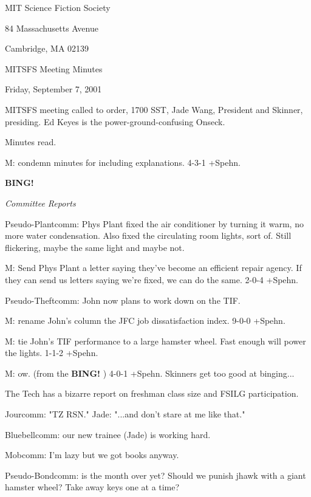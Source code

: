 \documentclass[12pt]{article}
\newcommand{\bing}{{\bf BING!} }
\newcommand{\goto}[1]{\bing \vskip 12pt \centerline{{\em{#1}}}}
\begin{document}
\begin{center}

MIT Science Fiction Society 

84 Massachusetts Avenue

Cambridge, MA 02139

\vspace{12pt}

MITSFS Meeting Minutes 

Friday, September 7, 2001

\end{center}
 
\vspace{18pt}

\setlength{\parskip}{6pt}

\noindent
MITSFS meeting called to order, 1700 SST, Jade Wang, President and
Skinner, presiding.  Ed Keyes is the power-ground-confusing Onseck.

Minutes read.

M: condemn minutes for including explanations. 4-3-1 +Spehn.

\goto{Committee Reports}

Pseudo-Plantcomm: Phys Plant fixed the air conditioner by turning it warm, no more water condensation. Also fixed the circulating room lights, sort of. Still flickering, maybe the same light and maybe not.

M: Send Phys Plant a letter saying they've become an efficient repair agency. If they can send us letters saying we're fixed, we can do the same. 2-0-4 +Spehn.

Pseudo-Theftcomm: John now plans to work down on the TIF.

M: rename John's column the JFC job dissatisfaction index. 9-0-0 +Spehn.

M: tie John's TIF performance to a large hamster wheel. Fast enough will power the lights. 1-1-2 +Spehn.

M: ow. (from the \bing) 4-0-1 +Spehn. Skinners get too good at binging...

The Tech has a bizarre report on freshman class size and FSILG participation.

Jourcomm: "TZ RSN." Jade: "...and don't stare at me like that."

Bluebellcomm: our new trainee (Jade) is working hard.

Mobcomm: I'm lazy but we got books anyway.

Pseudo-Bondcomm: is the month over yet? Should we punish jhawk with a giant hamster wheel? Take away keys one at a time?
\end{document}
